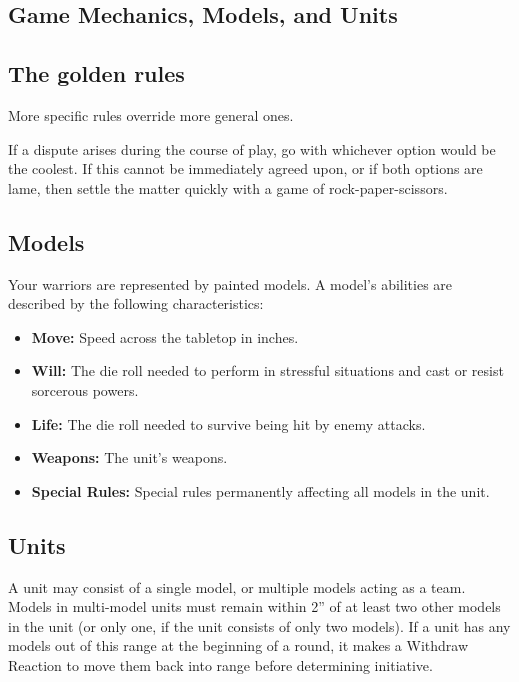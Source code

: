 \begin{multicols}{2}
\chapter*{Game Mechanics, Models, and Units}

\section*{The golden rules}

More specific rules override more general ones.

If a dispute arises during the course of play, go with whichever option would be the coolest. If this cannot be immediately agreed upon, or if both options are lame, then settle the matter quickly with a game of rock-paper-scissors.




\section*{Models}

Your warriors are represented by painted models. A model's abilities are described by the following characteristics:
\begin{itemize}
    \item \textbf{Move:} Speed across the tabletop in inches.
    \item \textbf{Will:} The die roll needed to perform in stressful situations and cast or resist sorcerous powers.
    \item \textbf{Life:} The die roll needed to survive being hit by enemy attacks.
    \item \textbf{Weapons:} The unit's weapons.
    \item \textbf{Special Rules:} Special rules permanently affecting all models in the unit.
\end{itemize}





\section*{Units}

A unit may consist of a single model, or multiple models acting as a team. Models in multi-model units must remain within 2'' of at least two other models in the unit (or only one, if the unit consists of only two models). If a unit has any models out of this range at the beginning of a round, it makes a Withdraw Reaction to move them back into range before determining initiative.


\end{multicols}
